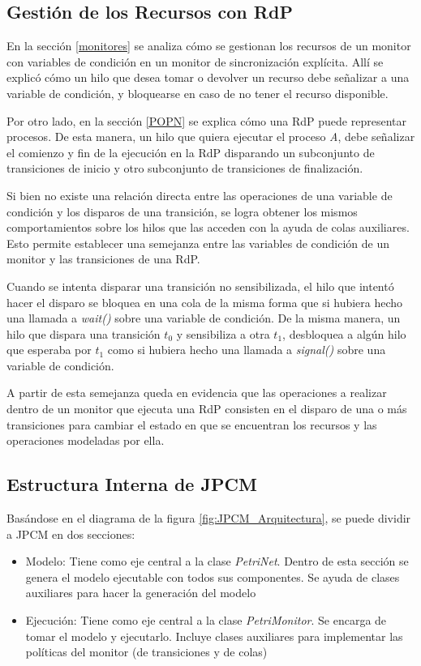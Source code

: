 \subsection{Gestión de los Recursos con RdP}
\label{JPCM_gestion_rec_rdp}
En la sección \ref{monitores} se analiza cómo se gestionan los recursos de un
monitor con variables de condición en un monitor de sincronización explícita.
Allí se explicó cómo un hilo que desea tomar o devolver un recurso debe
señalizar a una variable de condición, y bloquearse en caso de no tener el
recurso disponible.

Por otro lado, en la sección \ref{POPN} se explica cómo una RdP puede
representar procesos. De esta manera, un hilo que quiera ejecutar el proceso
\textit{A}, debe señalizar el comienzo y fin de la ejecución en la RdP
disparando un subconjunto de transiciones de inicio y otro subconjunto de
transiciones de finalización.
 
Si bien no existe una relación directa entre las operaciones de una variable de
condición y los disparos de una transición, se logra obtener los mismos
comportamientos sobre los hilos que las acceden con la ayuda de colas
auxiliares. Esto permite establecer una semejanza entre las variables de
condición de un monitor y las transiciones de una RdP.

Cuando se intenta disparar una transición no sensibilizada, el hilo que intentó
hacer el disparo se bloquea en una cola de la misma forma que si hubiera hecho
una llamada a \textit{wait()} sobre una variable de condición. De la misma
manera, un hilo que dispara una transición $t_{0}$ y sensibiliza a otra $t_{1}$,
desbloquea a algún hilo que esperaba por $t_{1}$ como si hubiera hecho una
llamada a \textit{signal()} sobre una variable de condición.

A partir de esta semejanza queda en evidencia que las operaciones a realizar
dentro de un monitor que ejecuta una RdP consisten en el disparo de una o más
transiciones para cambiar el estado en que se encuentran los recursos y las
operaciones modeladas por ella.

\subsection{Estructura Interna de JPCM}
Basándose en el diagrama de la figura \ref{fig:JPCM_Arquitectura}, se puede
dividir a JPCM en dos secciones:
\begin{itemize}
    \item Modelo: Tiene como eje central a la clase \textit{PetriNet}. Dentro de
    esta sección se genera el modelo ejecutable con todos sus componentes. Se ayuda
    de clases auxiliares para hacer la generación del modelo
    \item Ejecución: Tiene como eje central a la clase \textit{PetriMonitor}. Se
    encarga de tomar el modelo y ejecutarlo. Incluye clases auxiliares para
    implementar las políticas del monitor (de transiciones y de colas)
\end{itemize}

